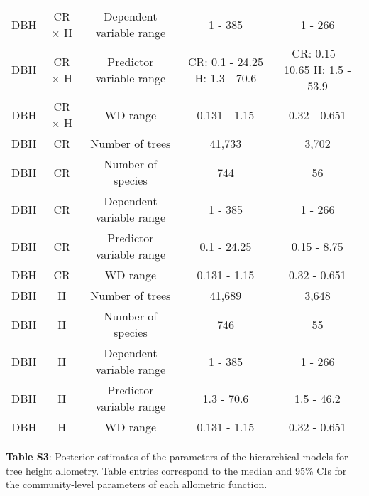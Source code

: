 \documentclass[
  12pt,
  letterpaper,
  DIV=11,
  numbers=noendperiod]{scrartcl}
\begin{document}
\begin{longtable*}[t]{ccccc}
DBH & CR × H & Dependent variable range & 1 - 385 & 1 - 266\\
DBH & CR × H & Predictor variable range & CR: 0.1 - 24.25 H: 1.3 - 70.6 & CR: 0.15 - 10.65 H: 1.5 - 53.9\\
DBH & CR × H & WD range & 0.131 - 1.15 & 0.32 - 0.651\\
\addlinespace
DBH & CR & Number of trees & 41,733 & 3,702\\
DBH & CR & Number of species & 744 & 56\\
DBH & CR & Dependent variable range & 1 - 385 & 1 - 266\\
DBH & CR & Predictor variable range & 0.1 - 24.25 & 0.15 - 8.75\\
DBH & CR & WD range & 0.131 - 1.15 & 0.32 - 0.651\\
\addlinespace
DBH & H & Number of trees & 41,689 & 3,648\\
DBH & H & Number of species & 746 & 55\\
DBH & H & Dependent variable range & 1 - 385 & 1 - 266\\
DBH & H & Predictor variable range & 1.3 - 70.6 & 1.5 - 46.2\\
DBH & H & WD range & 0.131 - 1.15 & 0.32 - 0.651\\
\bottomrule
\end{longtable*}
\endgroup{}

\newpage

\textbf{Table S3}: Posterior estimates of the parameters of the
hierarchical models for tree height allometry. Table entries correspond
to the median and 95\% CIs for the community-level parameters of each
allometric function.

\begingroup\fontsize{10}{12}\selectfont
\end{document}
